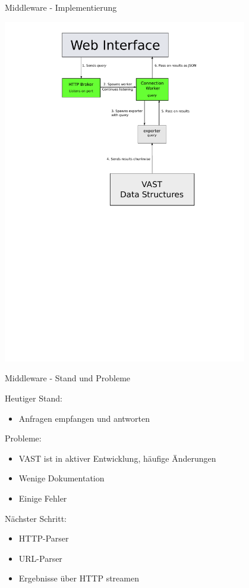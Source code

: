 \documentclass[9pt]{beamer}
\begin{document}
\begin{frame}{Middleware - Implementierung}{}
	\begin{center}
	\includegraphics[width=0.8\textwidth]{res/swp_vast_detail.pdf}
	\end{center}
\end{frame}

\begin{frame}{Middleware - Stand und Probleme}{}

	Heutiger Stand:
	\begin{itemize}
		\item Anfragen empfangen und antworten
	\end{itemize}

	Probleme:
	\begin{itemize}
		\item VAST ist in aktiver Entwicklung, häufige Änderungen
		\item Wenige Dokumentation
		\item Einige Fehler
	\end{itemize}
	
	Nächster Schritt:
	\begin{itemize}
		\item HTTP-Parser
		\item URL-Parser
		\item Ergebnisse über HTTP streamen 
	\end{itemize}

\end{frame}
\end{document}
